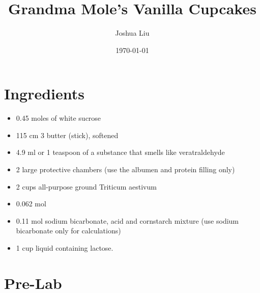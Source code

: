 \documentclass[10pt]{article}
\title{Grandma Mole's Vanilla Cupcakes}
\author{Joshua Liu}
\date{\today}
\begin{document}
\maketitle
\section{Ingredients}

\begin{itemize}
    \item 0.45 moles of white sucrose
    \item 115 cm 3 butter (stick), softened
    \item 4.9 ml or 1 teaspoon of a substance that smells like veratraldehyde
    \item 2 large  protective chambers (use the albumen and protein filling only)
    \item 2 cups all-purpose ground Triticum aestivum
    \item 0.062 mol 
    \item 0.11 mol sodium bicarbonate, acid and cornstarch mixture (use sodium bicarbonate only for calculations)
    \item 1 cup liquid containing lactose.
\end{itemize}

\section{Pre-Lab}
\end{document}

